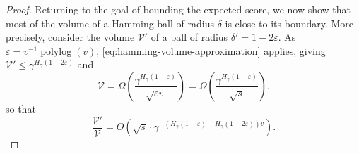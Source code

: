 \documentclass[a4paper,UKenglish,cleveref, autoref, thm-restate]{lipics-v2021}
\theoremstyle{definition}
\newcommand{\polylog}{\operatorname{polylog}}
\newcommand{\eps}{\varepsilon}
\newcommand{\vcommitlength}{v}
\newcommand{\alphabetsize}{\gamma}
\begin{document}
\begin{proof}
    Returning to the goal of bounding the expected score, we now show that most of the volume of a Hamming ball of radius $\delta$ is close to its boundary. More precisely, consider the volume $\mathcal{V}'$ of a ball of radius $\delta' = 1 - 2\eps$. As $\eps = \vcommitlength^{-1} \polylog(\vcommitlength)$, \cref{eq:hamming-volume-approximation} applies, giving $\mathcal{V}' \leq \alphabetsize^{H_\alphabetsize(1 - 2\eps)}$ and
    \begin{equation*}
        \mathcal{V} = \Omega\left(\frac{\alphabetsize^{H_\alphabetsize(1 - \eps)}}{\sqrt{\eps \vcommitlength}}\right) = \Omega\left(\frac{\alphabetsize^{H_\alphabetsize(1 - \eps)}}{\sqrt{s}}\right).
    \end{equation*}
    so that
    \begin{equation*}
        \frac{\mathcal{V}'}{\mathcal{V}} = O\left(\sqrt{s} \cdot \alphabetsize^{-\left(H_\alphabetsize(1 - \eps) - H_\alphabetsize(1 - 2\eps)\right)\vcommitlength}\right).
    \end{equation*}
    

\end{proof}
\end{document}

